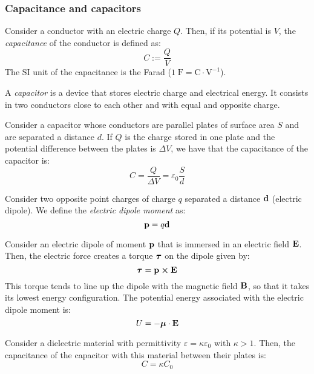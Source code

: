\documentclass[../../../main.tex]{subfiles}
\begin{document}
\begin{multicols}{2}
  \subsubsection{Capacitance and capacitors}
  \begin{definition}[Capacitance]
    Consider a conductor with an electric charge $Q$. Then, if its potential is $V$, the \emph{capacitance} of the conductor is defined as: $$C:=\frac{Q}{V}$$
    The SI unit of the capacitance is the Farad ($1\;\text{F}=\text{C}\cdot\text{V}^{-1}$).
  \end{definition}
  \begin{definition}[Capacitor]
    A \emph{capacitor} is a device that stores electric charge and electrical energy. It consists in two conductors close to each other and with equal and opposite charge.
  \end{definition}
  \begin{prop}
    Consider a capacitor whose conductors are parallel plates of surface area $S$ and are separated a distance $d$. If $Q$ is the charge stored in one plate and the  potential difference between the plates is $\Delta V$, we have that the capacitance of the capacitor is: $$C=\frac{Q}{\Delta V}=\varepsilon_0\frac{S}{d}$$
  \end{prop}
  \begin{definition}
    Consider two opposite point charges of charge $q$ separated a distance $\boldsymbol{\mathrm{d}}$ (electric dipole). We define the \emph{electric dipole moment} as: $$\boldsymbol{\mathrm{p}}=q\boldsymbol{\mathrm{d}}$$
  \end{definition}
  \begin{prop}
    Consider an electric dipole of moment $\boldsymbol{\mathrm{p}}$ that is immersed in an electric field $\boldsymbol{\mathrm{E}}$. Then, the electric force creates a torque $\boldsymbol{\mathrm{\tau}}$ on the dipole given by: $$\vf{\tau}=\vf{p}\crossprod\vf{E}$$ This torque tends to line up the dipole with the magnetic field $\boldsymbol{\mathrm{B}}$, so that it takes its lowest energy configuration. The potential energy associated with the electric dipole moment is: $$U=-\boldsymbol{\mathrm{\mu}}\cdot\boldsymbol{\mathrm{E}}$$
  \end{prop}
  \begin{center}
    \begin{minipage}{\linewidth}
      \centering
      
    \end{minipage}
  \end{center}
  \begin{prop}
    Consider a dielectric material with permittivity $\varepsilon=\kappa\varepsilon_0$ with $\kappa>1$. Then, the capacitance of the capacitor with this material between their plates is: $$C=\kappa C_0$$

\end{prop}
\end{multicols}
\end{document}
